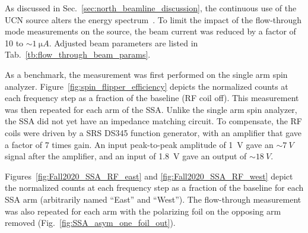As discussed in Sec.~\ref{sec:north_beamline_discussion}, the continuous use of the UCN source alters the energy spectrum~\cite{anghel_solid_2018}. To limit the impact of the flow-through mode measurements on the source, the beam current was reduced by a factor of 10 to $\sim \qty{1}{\micro A}$. Adjusted beam parameters are listed in Tab.~\ref{tb:flow_through_beam_params}.

As a benchmark, the measurement was first performed on the single arm spin analyzer.  Figure~\ref{fig:spin_flipper_efficiency} depicts the normalized \ucn counts at each frequency step as a fraction of the baseline (RF coil off). This measurement was then repeated for each arm of the SSA. Unlike the single arm spin analyzer, the SSA did not yet have an impedance matching circuit. To compensate, the RF coils were driven by a SRS DS345 function generator, with an amplifier that gave a factor of 7 times gain. An input peak-to-peak amplitude of \qty{1}{V} gave an $\sim\qty{7}{V}$ signal after the amplifier, and an input of \qty{1.8}{V} gave an output of $\sim\qty{18}{V}$.

Figures~\ref{fig:Fall2020_SSA_RF_east} and \ref{fig:Fall2020_SSA_RF_west} depict the  normalized \ucn counts at each frequency step as a fraction of the baseline for each SSA arm (arbitrarily named ``East'' and ``West''). The flow-through measurement was also repeated for each arm with the polarizing foil on the opposing arm removed (Fig.~\ref{fig:SSA_asym_one_foil_out}).





